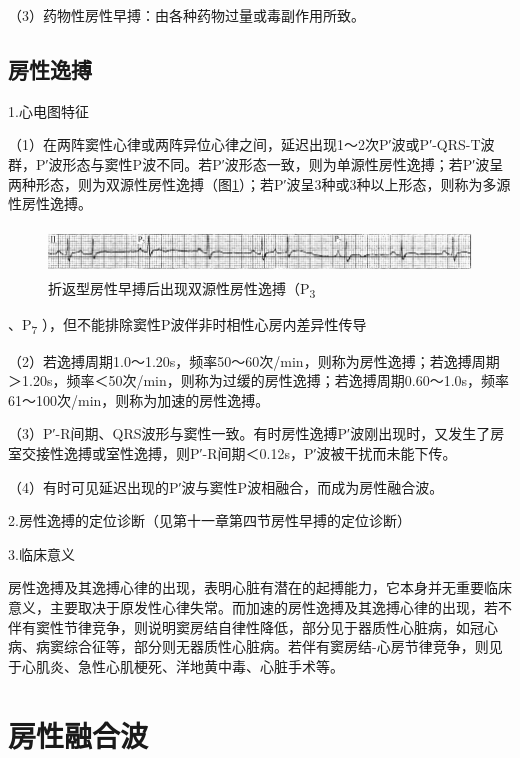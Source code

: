 （3）药物性房性早搏：由各种药物过量或毒副作用所致。

\protect\hypertarget{text00007.htmlux5cux23subid23}{}{}

\subsection{房性逸搏}

1.心电图特征

（1）在两阵窦性心律或两阵异位心律之间，延迟出现1～2次P′波或P′-QRS-T波群，P′波形态与窦性P波不同。若P′波形态一致，则为单源性房性逸搏；若P′波呈两种形态，则为双源性房性逸搏（图\ref{fig1-26}）；若P′波呈3种或3种以上形态，则称为多源性房性逸搏。

\begin{figure}[!htbp]
 \centering
 \includegraphics[width=5.78125in,height=0.48958in]{./images/Image00032.jpg}
 \captionsetup{justification=centering}
 \caption{折返型房性早搏后出现双源性房性逸搏（P\textsubscript{3}}
 \label{fig1-26}
  \end{figure} 
、P\textsubscript{7} ），但不能排除窦性P波伴非时相性心房内差异性传导

（2）若逸搏周期1.0～1.20s，频率50～60次/min，则称为房性逸搏；若逸搏周期＞1.20s，频率＜50次/min，则称为过缓的房性逸搏；若逸搏周期0.60～1.0s，频率61～100次/min，则称为加速的房性逸搏。

（3）P′-R间期、QRS波形与窦性一致。有时房性逸搏P′波刚出现时，又发生了房室交接性逸搏或室性逸搏，则P′-R间期＜0.12s，P′波被干扰而未能下传。

（4）有时可见延迟出现的P′波与窦性P波相融合，而成为房性融合波。

2.房性逸搏的定位诊断（见第十一章第四节房性早搏的定位诊断）

3.临床意义

房性逸搏及其逸搏心律的出现，表明心脏有潜在的起搏能力，它本身并无重要临床意义，主要取决于原发性心律失常。而加速的房性逸搏及其逸搏心律的出现，若不伴有窦性节律竞争，则说明窦房结自律性降低，部分见于器质性心脏病，如冠心病、病窦综合征等，部分则无器质性心脏病。若伴有窦房结-心房节律竞争，则见于心肌炎、急性心肌梗死、洋地黄中毒、心脏手术等。

\protect\hypertarget{text00007.htmlux5cux23subid24}{}{}

\section{房性融合波}

